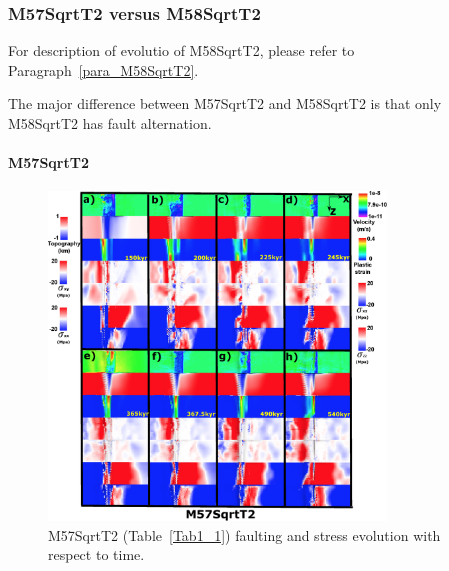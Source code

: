 \iffalse
\subsubsection{M57SqrtT2 versus M58SqrtT2}

For description of evolutio of M58SqrtT2, please refer to Paragraph~\hyperref[para_M58SqrtT2]{\ref{para_M58SqrtT2}}.

The major difference between M57SqrtT2 and M58SqrtT2 is that only M58SqrtT2 has fault alternation.

\paragraph{M57SqrtT2}

\begin{figure}[h]
 \centering
  \includegraphics[width=0.8\textwidth]{./Figures/fig_Results_MRange_3_M57SqrtT2_time_evolution.eps}
 \caption{M57SqrtT2 (Table~\hyperref[Tab1_1]{\ref{Tab1_1}}) faulting and stress evolution with respect to time.}
\label{fig_Results_MRange_3}
\end{figure}

